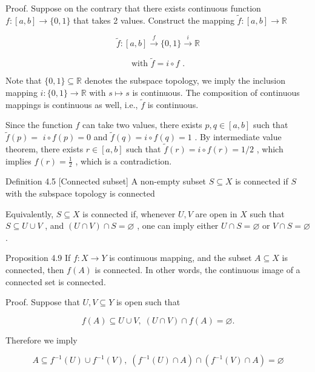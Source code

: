 Proof. Suppose on the contrary that there exists continuous function \(f : \left\lbrack  {a,b}\right\rbrack   \rightarrow  \{ 0,1\}\) that takes 2 values. Construct the mapping \(\widetilde{f} : \left\lbrack  {a,b}\right\rbrack   \rightarrow  \mathbb{R}\)

\[
\widetilde{f} : \left\lbrack  {a,b}\right\rbrack  \overset{f}{ \rightarrow  }\{ 0,1\} \overset{i}{ \rightarrow  }\mathbb{R}
\]

\[
\text{ with }\widetilde{f} = i \circ  f\text{ . }
\]

Note that \(\{ 0,1\}  \subseteq  \mathbb{R}\) denotes the subspace topology, we imply the inclusion mapping \(i : \{ 0,1\}  \rightarrow  \mathbb{R}\) with \(s \mapsto  s\) is continuous. The composition of continuous mappings is continuous as well, i.e., \(\widetilde{f}\) is continuous.

Since the function \(f\) can take two values, there exists \(p,q \in  \left\lbrack  {a,b}\right\rbrack\) such that \(\widetilde{f}\left( p\right)  =\)  \(i \circ  f\left( p\right)  = 0\) and \(\widetilde{f}\left( q\right)  = i \circ  f\left( q\right)  = 1\) . By intermediate value theorem, there exists \(r \in  \left\lbrack  {a,b}\right\rbrack\) such that \(\widetilde{f}\left( r\right)  = i \circ  f\left( r\right)  = 1/2\) , which implies \(f\left( r\right)  = \frac{1}{2}\) , which is a contradiction.

Definition 4.5 [Connected subset] A non-empty subset \(S \subseteq  X\) is connected if \(S\) with the subspace topology is connected

Equivalently, \(S \subseteq  X\) is connected if, whenever \(U,V\) are open in \(X\) such that \(S \subseteq  U \cup  V\) , and \(\left( {U \cap  V}\right)  \cap  S = \varnothing\) , one can imply either \(U \cap  S = \varnothing\) or \(V \cap  S = \varnothing\) .

Proposition 4.9 If \(f : X \rightarrow  Y\) is continuous mapping, and the subset \(A \subseteq  X\) is connected, then \(f\left( A\right)\) is connected. In other words, the continuous image of a connected set is connected.

Proof. Suppose that \(U,V \subseteq  Y\) is open such that

\[
f\left( A\right)  \subseteq  U \cup  V,\;\left( {U \cap  V}\right)  \cap  f\left( A\right)  = \varnothing .
\]

Therefore we imply

\[
A \subseteq  {f}^{-1}\left( U\right)  \cup  {f}^{-1}\left( V\right) ,\;\left( {{f}^{-1}\left( U\right)  \cap  A}\right)  \cap  \left( {{f}^{-1}\left( V\right)  \cap  A}\right)  = \varnothing
\]

